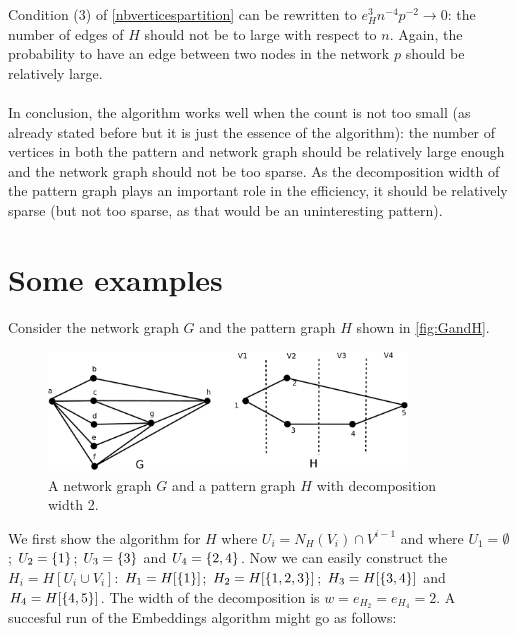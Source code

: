 \documentclass[a4paper,english,12pt,]{scrartcl}
\begin{document}
Condition (3) of \autoref{nbverticespartition} can be rewritten to $e_H^3n^{-4}p^{-2}\rightarrow 0$: the number of edges of $H$ should not be to large with respect to $n$. Again, the probability to have an edge between two nodes in the network $p$ should be relatively large.

\paragraph{}
In conclusion, the algorithm works well when the count is not too small (as already stated before but it is just the essence of the algorithm): the number of vertices in both the pattern and network graph should be relatively large enough and the network graph should not be too sparse. As the decomposition width of the pattern graph plays an important role in the efficiency, it should be relatively sparse (but not too sparse, as that would be an uninteresting pattern). 
% 
% 


\clearpage
\appendix
\section{Some examples}

Consider the network graph $G$ and the pattern graph $H$ shown in \autoref{fig:GandH}.
\begin{figure}[hbpt]
 \centering
 \includegraphics[width=0.85\textwidth]{./examples/GandH}
  \caption{A network graph $G$ and a pattern graph $H$ with decomposition width 2. \label{fig:GandH}}
\end{figure}

We first show the algorithm for $H$ where $U_i=N_H(V_i)\cap V^{i-1}$ and where $U_1=\emptyset{}$; $U_2 = \{1\}$; $U_3 = \{3\}$ and $U_4 = \{2,4\}$. Now we can easily construct the $H_i=H[U_i\cup V_i]$: $H_1=H[\{1\}]$; $H_2=H[\{1,2,3\}]$; $H_3 = H[\{3,4\}]$ and $H_4 = H[\{4,5\}]$.
The width of the decomposition is $w= e_{H_2}=e_{H_4}=2$.
A succesful run of the Embeddings algorithm might go as follows:
\end{document}

